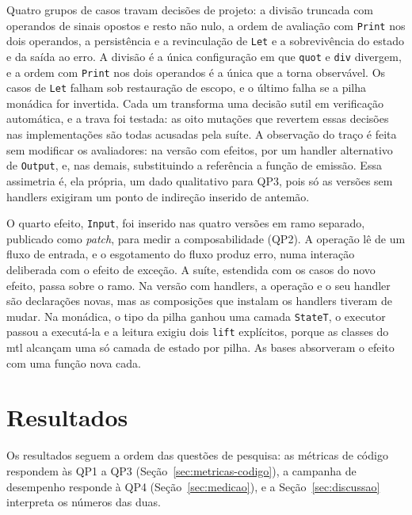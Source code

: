 \documentclass[12pt]{article}
\begin{document}
Quatro grupos de casos travam decisões de projeto: a divisão truncada com
operandos de sinais opostos e resto não nulo, a ordem de avaliação com
\texttt{Print} nos dois operandos, a persistência e a revinculação de
\texttt{Let} e a sobrevivência do estado e da saída ao erro. A divisão é a
única configuração em que \texttt{quot} e \texttt{div} divergem, e a ordem
com \texttt{Print} nos dois operandos é a única que a torna observável. Os
casos de \texttt{Let} falham sob restauração de escopo, e o último falha se a
pilha monádica for invertida. Cada um transforma uma decisão sutil em verificação
automática, e a trava foi testada: as oito mutações que revertem essas
decisões nas implementações são todas acusadas pela suíte.
A observação do traço é feita sem modificar os avaliadores: na versão com
efeitos, por um handler alternativo de \texttt{Output}, e, nas demais,
substituindo a referência a função de emissão. Essa assimetria é, ela
própria, um dado qualitativo para QP3, pois só as versões sem
handlers exigiram um ponto de indireção inserido de antemão.

O quarto efeito, \texttt{Input}, foi inserido nas quatro versões em ramo
separado, publicado como \textit{patch}, para medir a composabilidade (QP2). A
operação lê de um fluxo de entrada, e o esgotamento do fluxo produz erro, numa
interação deliberada com o efeito de exceção. A suíte, estendida com os casos
do novo efeito, passa sobre o ramo. Na versão com handlers, a operação e
o seu handler são declarações novas, mas as composições que instalam
os handlers tiveram de mudar. Na monádica, o tipo da pilha ganhou uma
camada \texttt{StateT}, o executor passou a executá-la e a leitura exigiu dois
\texttt{lift} explícitos, porque as classes do mtl alcançam uma só
camada de estado por pilha. As bases absorveram o efeito com uma função nova
cada.

\section{Resultados}\label{sec:resultados}

Os resultados seguem a ordem das questões de pesquisa: as métricas de código
respondem às QP1 a QP3 (Seção~\ref{sec:metricas-codigo}), a campanha de
desempenho responde à QP4 (Seção~\ref{sec:medicao}), e a
Seção~\ref{sec:discussao} interpreta os números das duas.
\end{document}
